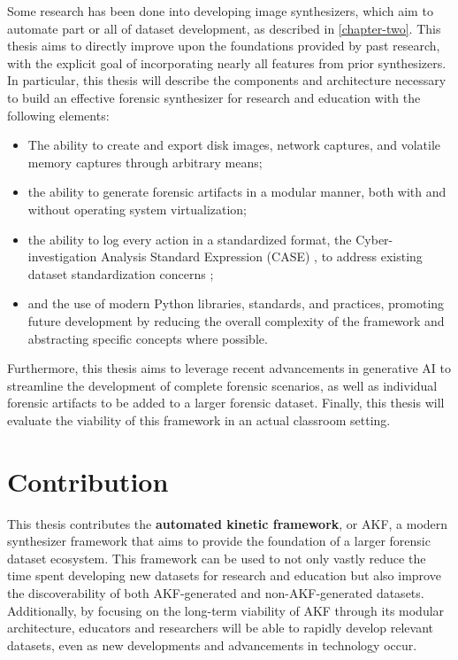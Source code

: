 \documentclass[letterpaper,12pt]{report}
\def\tightlist{}
\begin{document}
Some research has been done into developing image synthesizers, which
aim to automate part or all of dataset development, as described in
\autoref{chapter-two}. This thesis aims to directly improve
upon the foundations provided by past research, with the explicit goal
of incorporating nearly all features from prior synthesizers. In
particular, this thesis will describe the components and architecture
necessary to build an effective forensic synthesizer for research and
education with the following elements:

\begin{itemize}
\tightlist
\item
  The ability to create and export disk images, network captures, and
  volatile memory captures through arbitrary means;
\item
  the ability to generate forensic artifacts in a modular manner, both
  with and without operating system virtualization;
\item
  the ability to log every action in a standardized format, the
  Cyber-investigation Analysis Standard Expression (CASE)
  \cite{caseyAdvancingCoordinatedCyberinvestigations2017}, to
  address existing dataset standardization concerns
  \cite{horsmanDatasetConstructionChallenges2021};
\item
  and the use of modern Python libraries, standards, and practices,
  promoting future development by reducing the overall complexity of the
  framework and abstracting specific concepts where possible.
\end{itemize}

Furthermore, this thesis aims to leverage recent advancements in
generative AI to streamline the development of complete forensic
scenarios, as well as individual forensic artifacts to be added to a
larger forensic dataset. Finally, this thesis will evaluate the
viability of this framework in an actual classroom setting.

\section{Contribution}\label{contribution}

This thesis contributes the \textbf{automated kinetic framework}, or
AKF, a modern synthesizer framework that aims to provide the foundation
of a larger forensic dataset ecosystem. This framework can be used to
not only vastly reduce the time spent developing new datasets for
research and education but also improve the discoverability of both
AKF-generated and non-AKF-generated datasets. Additionally, by focusing
on the long-term viability of AKF through its modular architecture,
educators and researchers will be able to rapidly develop relevant
datasets, even as new developments and advancements in technology occur.
\end{document}
